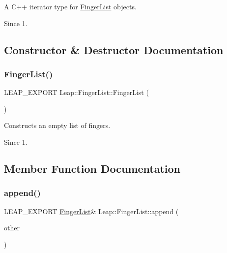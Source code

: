 A C++ iterator type for \hyperlink{class_leap_1_1_finger_list}{Finger\+List} objects.


\begin{DoxyCodeInclude}
\end{DoxyCodeInclude}


\begin{DoxySince}{Since}
1. 
\end{DoxySince}


\subsection{Constructor \& Destructor Documentation}
\mbox{\label{class_leap_1_1_finger_list_aa04009715ecbb8b2417a1459ed3bb7fd}} 
\subsubsection{\texorpdfstring{Finger\+List()}{FingerList()}}
{\footnotesize\ttfamily L\+E\+A\+P\+\_\+\+E\+X\+P\+O\+RT Leap\+::\+Finger\+List\+::\+Finger\+List (\begin{DoxyParamCaption}{ }\end{DoxyParamCaption})}

Constructs an empty list of fingers. \begin{DoxySince}{Since}
1. 
\end{DoxySince}


\subsection{Member Function Documentation}
\mbox{\label{class_leap_1_1_finger_list_ab032377473c269651a1110f3a5de3263}} 
\subsubsection{\texorpdfstring{append()}{append()}}
{\footnotesize\ttfamily L\+E\+A\+P\+\_\+\+E\+X\+P\+O\+RT \hyperlink{class_leap_1_1_finger_list}{Finger\+List}\& Leap\+::\+Finger\+List\+::append (\begin{DoxyParamCaption}\item[{const \hyperlink{class_leap_1_1_finger_list}{Finger\+List} \&}]{other }\end{DoxyParamCaption})}

